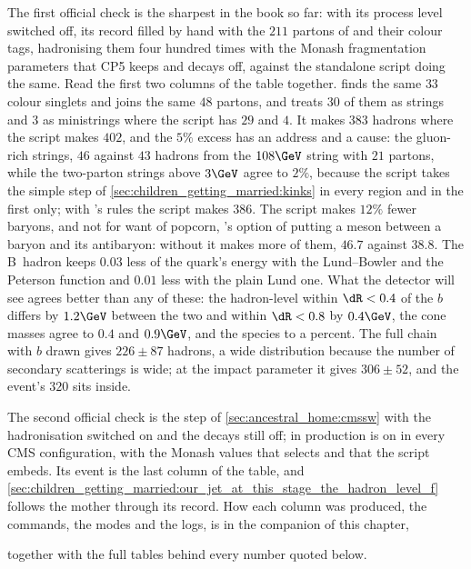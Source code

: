 The first official check is the sharpest in the book so far: \PYTHIA with
its process level switched off, its record filled by hand with the $211$
partons of  and their colour tags, hadronising them
four hundred times with the Monash fragmentation parameters that CP5
keeps and decays off, against the standalone script doing the same. Read
the first two columns of the table together. \PYTHIA finds the same $33$
colour singlets and joins the same $48$ partons, and treats $30$ of them
as strings and $3$ as ministrings where the script has $29$ and $4$. It
makes $383$ hadrons where the script makes $402$, and the $5\%$ excess has
an address and a cause: the gluon-rich strings, $46$ against $43$ hadrons
from the $108\GeV$ string with $21$ partons, while the two-parton strings
above $3\GeV$ agree to $2\%$, because the script takes the simple step of
\cref{sec:children_getting_married:kinks} in every region and \PYTHIA in
the first only; with \PYTHIA's rules the script makes $386$. The script
makes $12\%$ fewer baryons, and not for want of popcorn, \PYTHIA's option
of putting a meson between a baryon and its antibaryon: without it \PYTHIA
makes more of them, $46.7$ against $38.8$. The B~hadron keeps $0.03$ less
of the quark's energy with the Lund--Bowler and the Peterson function and
$0.01$ less with the plain Lund one. What the
detector will see agrees better than any of these: the hadron-level \pt
within $\dR<0.4$ of the $b$ differs by $1.2\GeV$ between the two and within
$\dR<0.8$ by $0.4\GeV$, the cone masses agree to $0.4$ and $0.9\GeV$, and
the species to a percent. The full chain with $b$ drawn gives $226\pm87$ hadrons, a
wide distribution because the number of secondary scatterings is wide; at
the \CMSSW impact parameter it gives $306\pm52$, and the \CMSSW event's
$320$ sits inside.
\label{sec:children_getting_married:cmssw}

The second official check is the  step of
\cref{sec:ancestral_home:cmssw} with the hadronisation switched on and the
decays still off; in production  is on in every CMS
configuration, with the Monash values that  selects and
that the script embeds. Its
event is the last column of the table, and
\cref{sec:children_getting_married:our_jet_at_this_stage_the_hadron_level_f}
follows the mother through its record. How each column was produced, the
commands, the modes and the logs, is in the companion of this chapter,
\begin{center}
\end{center}
together with the full tables behind every number quoted below.

